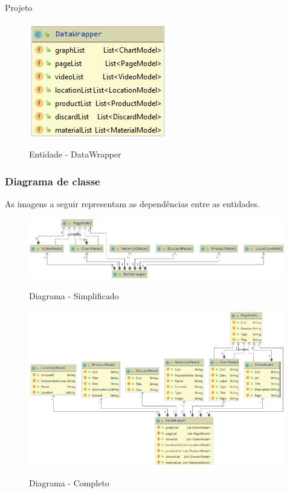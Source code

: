\documentclass[
	12pt,				%
	openany,			%
	twoside,			%
	a4paper,			%
	english,			%
	french,				%
	spanish,			%
	brazil				%
	]{abntex2}
\begin{document}
\begin{chapter}{Projeto}
\begin{enumerate}
\begin{itemize}
\end{itemize}
\begin{figure}[h]
\centering
   \caption{Entidade - DataWrapper}
   \includegraphics[scale=1.0]{media/DataWrapperModel.png}
     \label{fig:datawrapper}
\end{figure}
\end{enumerate}

\newpage
\subsubsection{Diagrama de classe}
As imagens a seguir representam as dependências entre as entidades.

\begin{figure}[h]
\centering
   \caption{Diagrama - Simplificado}
   \includegraphics[scale=0.7]{media/DataWrapper_.png}
     \label{fig:datawrapper_simp}
\end{figure}

\begin{figure}[h]
\centering
   \caption{Diagrama - Completo}
   \includegraphics[scale=0.85]{media/DataWrapper.png}
     \label{fig:datawrapper_comp}
\end{figure}


\end{chapter}
\end{document}
